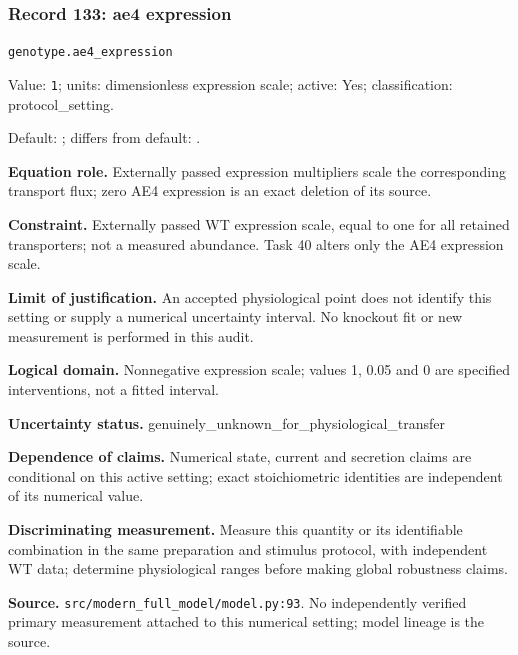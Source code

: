 \subsubsection*{Record 133: ae4 expression}
{\small \nolinkurl{genotype.ae4_expression}\par

Value: \texttt{1}; units: dimensionless expression scale; active: Yes; classification: protocol\_setting.\par

Default: ; differs from default: .\par

\textbf{Equation role.} Externally passed expression multipliers scale the corresponding transport flux; zero AE4 expression is an exact deletion of its source.\par

\textbf{Constraint.} Externally passed WT expression scale, equal to one for all retained transporters; not a measured abundance. Task 40 alters only the AE4 expression scale.\par

\textbf{Limit of justification.} An accepted physiological point does not identify this setting or supply a numerical uncertainty interval. No knockout fit or new measurement is performed in this audit.\par

\textbf{Logical domain.} Nonnegative expression scale; values 1, 0.05 and 0 are specified interventions, not a fitted interval.\par

\textbf{Uncertainty status.} genuinely\_unknown\_for\_physiological\_transfer\par

\textbf{Dependence of claims.} Numerical state, current and secretion claims are conditional on this active setting; exact stoichiometric identities are independent of its numerical value.\par

\textbf{Discriminating measurement.} Measure this quantity or its identifiable combination in the same preparation and stimulus protocol, with independent WT data; determine physiological ranges before making global robustness claims.\par

\textbf{Source.} \nolinkurl{src/modern_full_model/model.py:93}. No independently verified primary measurement attached to this numerical setting; model lineage is the source.\par}

